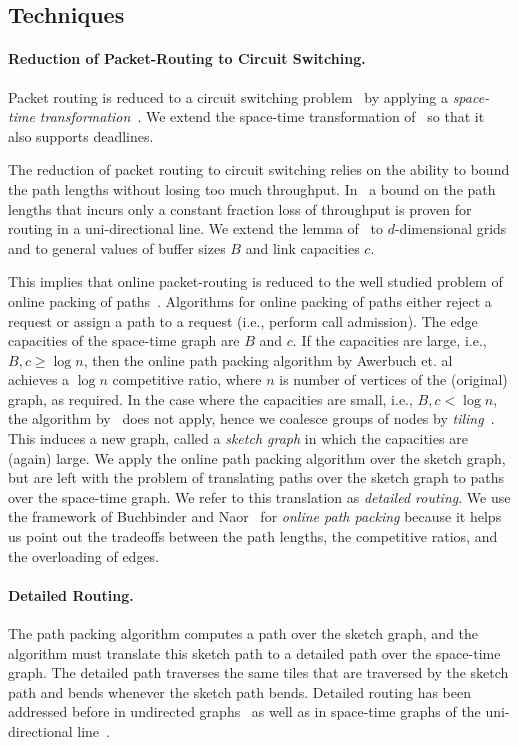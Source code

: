 \documentclass[11pt]{article}
\newenvironment{proof sketch}[1]{\noindent {\emph{Proof sketch of #1:}}}{\hfill \qed}
\begin{document}
\subsection{Techniques}\label{sec:tech}

\paragraph{Reduction of Packet-Routing to Circuit Switching.}
Packet routing is reduced to a circuit switching problem~\cite{KT,AAP} by applying a
\emph{space-time transformation}~\cite{AAF,ARSU,AZ,RR}.  We extend the space-time
transformation of~\cite{AZ} so that it also supports deadlines.

The reduction of packet routing to circuit switching relies on the ability to bound
the path lengths without losing too much throughput. In~\cite{AZ} a bound on the path
lengths that incurs only a constant fraction loss of throughput is proven for routing
in a uni-directional line. We extend the lemma of~\cite{AZ} to $d$-dimensional grids
and to general values of buffer sizes $B$ and link capacities $c$.

This implies that online packet-routing is reduced to the well studied problem of
online packing of paths~\cite{AAP, BN06}.  Algorithms for online packing of paths
either reject a request or assign a path to a request (i.e., perform call admission).  The
edge capacities of the space-time graph are $B$ and $c$.  If the capacities are
large, i.e., $B,c \geq \log n$, then the online path packing algorithm by Awerbuch
et. al~\cite{AAP} achieves a $\log n$ competitive ratio, where $n$ is number of
vertices of the (original) graph, as required.  In the case where the capacities are
small, i.e., $B,c < \log n$, the algorithm by~\cite{AAP} does not apply, hence we
coalesce groups of nodes by \emph{tiling}~\cite{KT,BL}. This induces a new graph,
called a \emph{sketch graph} in which the capacities are (again) large.  We apply the
online path packing algorithm over the sketch graph, but are left with the problem of
translating paths over the sketch graph to paths over the space-time graph. We refer
to this translation as \emph{detailed routing}. We use the framework of Buchbinder
and Naor~\cite{BN06,BNsurvey} for \emph{online path packing} because it helps us
point out the tradeoffs between the path lengths, the competitive ratios, and the
overloading of edges.

\paragraph{Detailed Routing.}
The path packing algorithm computes a path over the sketch graph, and the algorithm
must translate this sketch path to a detailed path over the space-time graph. The
detailed path traverses the same tiles that are traversed by the sketch path and
bends whenever the sketch path bends.  Detailed routing has been addressed before in
undirected graphs~\cite{KT,BL} as well as in space-time graphs of
the uni-directional line~\cite{RR}.
\end{document}
